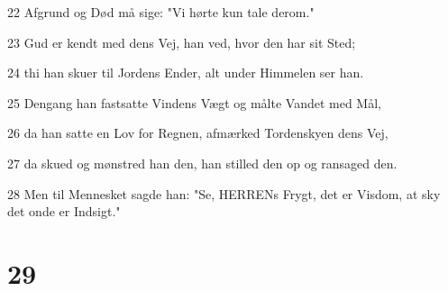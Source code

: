 \par 22 Afgrund og Død må sige: "Vi hørte kun tale derom."
\par 23 Gud er kendt med dens Vej, han ved, hvor den har sit Sted;
\par 24 thi han skuer til Jordens Ender, alt under Himmelen ser han.
\par 25 Dengang han fastsatte Vindens Vægt og målte Vandet med Mål,
\par 26 da han satte en Lov for Regnen, afmærked Tordenskyen dens Vej,
\par 27 da skued og mønstred han den, han stilled den op og ransaged den.
\par 28 Men til Mennesket sagde han: "Se, HERRENs Frygt, det er Visdom, at sky det onde er Indsigt."

\chapter{29}


